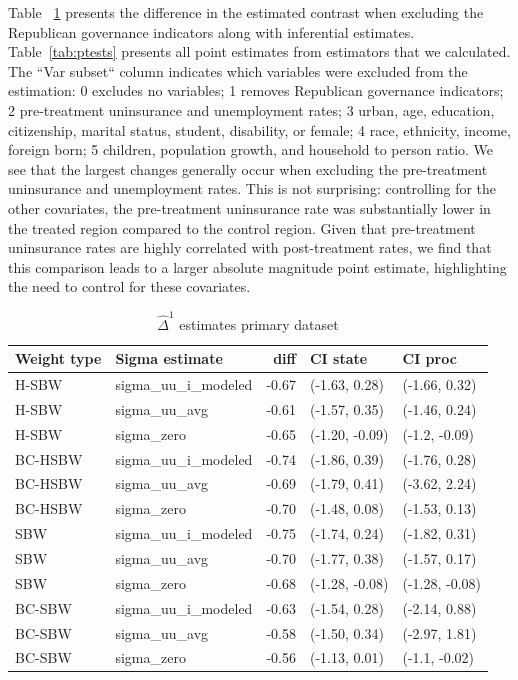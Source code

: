 Table ~\ref{tab:deltac1} presents the difference in the estimated contrast when excluding the Republican governance indicators along with inferential estimates. Table~\ref{tab:ptests} presents all point estimates from estimators that we calculated. The ``Var subset`` column indicates which variables were excluded from the estimation: 0 excludes no variables; 1 removes Republican governance indicators; 2 pre-treatment uninsurance and unemployment rates; 3 urban, age, education, citizenship, marital status, student, disability, or female; 4 race, ethnicity, income, foreign born; 5 children, population growth, and household to person ratio. We see that the largest changes generally occur when excluding the pre-treatment uninsurance and unemployment rates. This is not surprising: controlling for the other covariates, the pre-treatment uninsurance rate was substantially lower in the treated region compared to the control region. Given that pre-treatment uninsurance rates are highly correlated with post-treatment rates, we find that this comparison leads to a larger absolute magnitude point estimate, highlighting the need to control for these covariates.

\begin{table}[ht]
\centering
\caption{$\hat{\Delta}^1$ estimates primary dataset}
\label{tab:deltac1}
\begin{tabular}{llrll}
  \hline
Weight type & Sigma estimate & diff & CI state & CI proc \\ 
  \hline
H-SBW & sigma\_uu\_i\_modeled & -0.67 & (-1.63, 0.28) & (-1.66, 0.32) \\ 
  H-SBW & sigma\_uu\_avg & -0.61 & (-1.57, 0.35) & (-1.46, 0.24) \\ 
  H-SBW & sigma\_zero & -0.65 & (-1.20, -0.09) & (-1.2, -0.09) \\ 
  BC-HSBW & sigma\_uu\_i\_modeled & -0.74 & (-1.86, 0.39) & (-1.76, 0.28) \\ 
  BC-HSBW & sigma\_uu\_avg & -0.69 & (-1.79, 0.41) & (-3.62, 2.24) \\ 
  BC-HSBW & sigma\_zero & -0.70 & (-1.48, 0.08) & (-1.53, 0.13) \\ 
  SBW & sigma\_uu\_i\_modeled & -0.75 & (-1.74, 0.24) & (-1.82, 0.31) \\ 
  SBW & sigma\_uu\_avg & -0.70 & (-1.77, 0.38) & (-1.57, 0.17) \\ 
  SBW & sigma\_zero & -0.68 & (-1.28, -0.08) & (-1.28, -0.08) \\ 
  BC-SBW & sigma\_uu\_i\_modeled & -0.63 & (-1.54, 0.28) & (-2.14, 0.88) \\ 
  BC-SBW & sigma\_uu\_avg & -0.58 & (-1.50, 0.34) & (-2.97, 1.81) \\ 
  BC-SBW & sigma\_zero & -0.56 & (-1.13, 0.01) & (-1.1, -0.02) \\ 
   \hline
\end{tabular}
\end{table}

